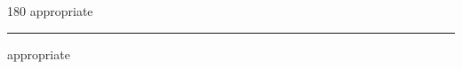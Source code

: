 
\begin{frame}
\begin{center}
\begin{turn}{180}
{\fontsize{2.5cm}{1em}\selectfont appropriate}
\end{turn}
\vspace{1em}\par  
\hrule
\vspace{1em}\par  
{\fontsize{2.5cm}{1em}\selectfont appropriate}
\end{center}
\end{frame}
